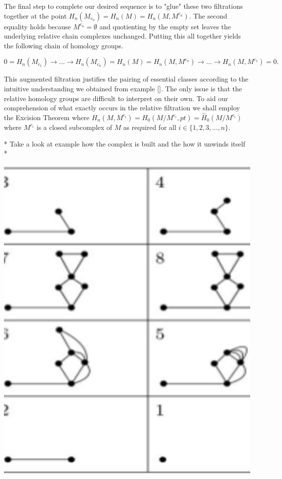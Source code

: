 The final step to complete our desired sequence is to "glue" these two filtrations together at the point $ H_n(M_{c_n}) = H_n(M) = H_n(M, M^{c_n})$. The second equality holds because $M^{c_n} = \emptyset$ and quotienting by the empty set leaves the underlying relative chain complexes unchanged. Putting this all together yields the following chain of homology groups.

$$ 0 = H_n(M_{c_1}) \rightarrow ... \rightarrow H_n(M_{c_n}) = H_n(M) = H_n(M, M^{c_n}) \rightarrow ... \rightarrow H_n(M, M^{c_{1}}) = 0.$$


This augmented filtration justifies the pairing of essential classes according to the intuitive understanding we obtained from example []. The only issue is that the relative homology groups are difficult to interpret on their own. To aid our comprehension of what exactly occurs in the relative filtration we shall employ the Excision Theorem where $H_n(M, M^{c_i}) = H_0(M / M^{c_i}, pt) = \overset{\sim}{H}_0(M / M^{c_i})$ where $M^{c_i}$ is a closed subcomplex of $M$ as required for all $i \in \{1, 2, 3, ..., n\}$. 

* Take a look at example how the complex is built and the how it unwinds itself *

\includegraphics[scale=0.2,center]{./images/extended-ph.eps}

